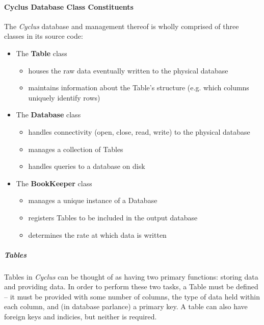 \documentclass[letterpaper,10pt,english]{sphinxmanual}
\begin{document}
\paragraph{Cyclus Database Class Constituents}
\label{devdoc/output_dbase:cyclus-database-class-constituents}
The \emph{Cyclus} database and management thereof is wholly comprised of three classes in
its source code:
\begin{itemize}
\item {} 
The \textbf{Table} class
\begin{itemize}
\item {} 
houses the raw data eventually written to the physical database

\item {} 
maintains information about the Table's structure (e.g. which columns uniquely identify rows)

\end{itemize}

\item {} 
The \textbf{Database} class
\begin{itemize}
\item {} 
handles connectivity (open, close, read, write) to the physical database

\item {} 
manages a collection of Tables

\item {} 
handles queries to a database on disk

\end{itemize}

\item {} 
The \textbf{BookKeeper} class
\begin{itemize}
\item {} 
manages a unique instance of a Database

\item {} 
registers Tables to be included in the output database

\item {} 
determines the rate at which data is written

\end{itemize}

\end{itemize}


\subparagraph{Tables}
\label{devdoc/output_dbase:tables}
Tables in \emph{Cyclus} can be thought of as having two primary functions: storing data and
providing data. In order to perform these two tasks, a Table must be defined -- it must be
provided with some number of columns, the type of data held within each column, and (in
database parlance) a primary key. A table can also have foreign keys and indicies, but neither
is required.
\end{document}
